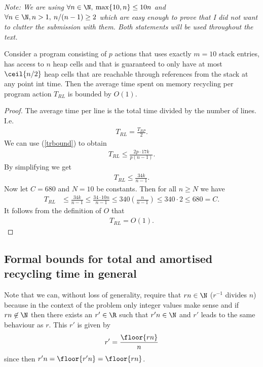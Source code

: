 \documentclass{article}
\begin{document}
\emph{Note: We are using $\forall n\in\N,\:\max\{10,n\}\leq 10n$ and $\forall n\in\N, n>1,\: n/(n-1) \geq 2$
which are easy enough to prove that I did not want to clutter the submission with them. Both statements
 will be used throughout the text.}

\begin{claim}
    Consider a program consisting of $p$ actions that uses exactly $m=10$
    stack entries, has access to $n$ heap cells and that is guaranteed to only
    have at most $\ceil{n/2}$ heap cells that are reachable through references
    from the stack at any point int time. Then the average time spent on memory recycling per program
    action $T_{RL}$ is bounded by $O(1)$.
\end{claim}
\begin{proof}
    The average time per line is the total time divided by the number of lines.
    I.e.
    \begin{align*}
        T_{RL} = \frac{T_{RP}}{2}.
    \end{align*}
    We can use (\ref{trbound}) to obtain
    \begin{align*}
        T_{RL} \leq \frac{2p\cdot 17k}{p(n-1)}.
    \end{align*}
    By simplifying we get
    \begin{align*}
        T_{RL} \leq \frac{34k}{n-1}.
    \end{align*}
    Now let $C=680$ and $N=10$ be constants. Then for all $n\geq N$
    we have
    \begin{align*}
        T_{RL} &\leq \frac{34k}{n-1} \leq \frac{34\cdot10n}{n-1} \leq 340\left(\frac{n}{n-1}\right)
        \leq 340\cdot 2 \leq 680 = C.
    \end{align*}
    It follows from the definition of $O$ that
    \begin{align*}
        T_{RL} = O(1).
    \end{align*}
\end{proof}

\subsection{Formal bounds for total and amortised recycling time in general}

Note that we can, without loss of generality, require that $rn\in\N$ ($r^{-1}$ divides $n$)
because in the context of the problem only integer values make sense and if
$rn\not\in\N$ then there exists an $r'\in\R$ such that $r'n\in\N$ and $r'$ leads 
to the same behaviour as $r$. This $r'$ is given by
\begin{align*}
    r'=\frac{\floor{rn}}{n}
\end{align*}
since then $r'n=\floor{r'n}=\floor{rn}$.
\end{document}
